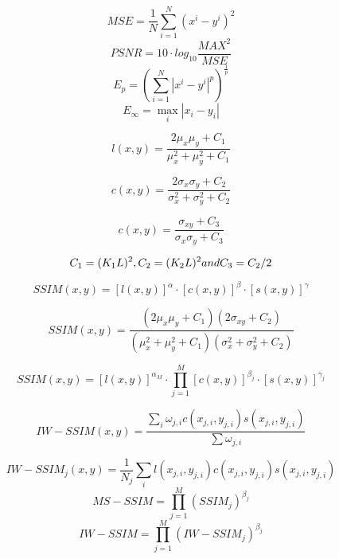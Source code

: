 \begin{equation}
MSE= \frac{1}{N} \sum_{i=1}^N{(x^i-y^i)^2}
\end{equation}
\begin{equation}
PSNR= 10 \cdot log_{10}\frac{MAX^2}{MSE}
\end{equation}
\begin{equation}
E_p = ( \sum_{i=1}^N{|x^i-y^i|^p})^{\frac{1}{p}}
\end{equation}
\begin{equation}
E_\infty = \max_i{|x_i-y_i|}
\end{equation}

\begin{equation}
l(x, y) = \frac{2\mu_x \mu_y + C_1}{\mu_x^2 + \mu_y^2 + C_1}
\end{equation}

\begin{equation}
c(x, y) = \frac{2\sigma_x \sigma_y + C_2}{\sigma_x^2 + \sigma_y^2 + C_2}
\end{equation}

\begin{equation}
c(x, y) = \frac{\sigma_{xy} + C_3}{\sigma_x \sigma_y + C_3}
\end{equation}

\begin{equation}
C_1 = (K_1 L)^2, C_2 = (K_2 L)^2 \space and \space C_3 = C_2/2
\end{equation}

\begin{equation}
SSIM(x, y) = [l(x, y)]^\alpha \cdot[c(x, y)]^\beta \cdot[s(x, y)]^\gamma
\end{equation} 

\begin{equation}
SSIM(x, y) = \frac{(2\mu_x \mu_y + C_1)(2\sigma_{xy} + C_2)}{(\mu_x^2 + \mu_y^2 + C_1)(\sigma_x^2 + \sigma_y^2 + C_2)}
\end{equation} 

\begin{equation}
SSIM(x, y) = [l(x, y)]^{\alpha_M} \cdot\prod_{j=1}^M{[c(x, y)]^{\beta_j} \cdot[s(x, y)]^{\gamma_j}}
\end{equation} 

\begin{equation}
IW-SSIM(x, y) = \frac{\sum_i{\omega_{j,i}c(x_{j,i},y_{j,i})s(x_{j,i},y_{j,i})}}{\sum{\omega_{j,i}}}
\end{equation} 

\begin{equation}
IW-SSIM_j(x, y) = \frac{1}{N_j}\sum_i{l(x_{j,i},y_{j,i})c(x_{j,i},y_{j,i})s(x_{j,i},y_{j,i})}
\end{equation} 
\begin{equation}
MS-SSIM= \prod_{j=1}^M{(SSIM_j)^{\beta_j}}
\end{equation}
\begin{equation}
IW-SSIM = \prod_{j=1}^M{( IW-SSIM_j)^{\beta_j}}
\end{equation}
